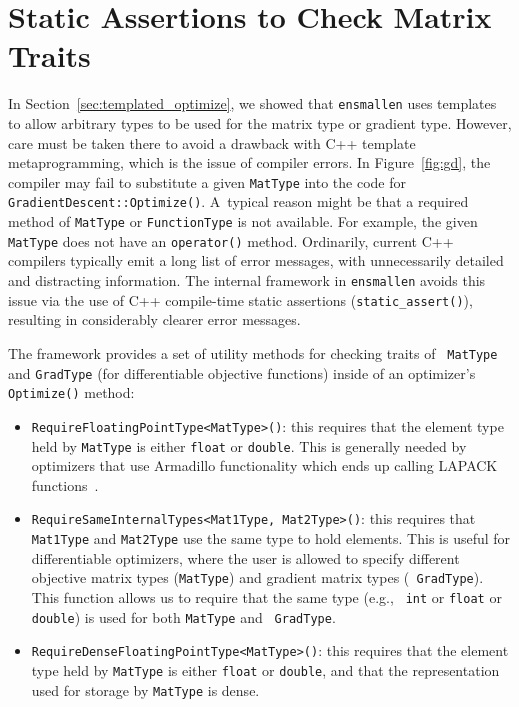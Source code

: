 \section{Static Assertions to Check Matrix Traits}
\label{sec:templated_optimize_details}

In Section~\ref{sec:templated_optimize}, we showed that {\tt ensmallen} uses
templates to allow arbitrary types to be used for the matrix type or gradient
type.
However, care must be taken there to avoid a drawback with C++ template metaprogramming,
which is the issue of compiler errors.
In Figure~\ref{fig:gd}, the compiler may fail to substitute a given {\tt MatType}
into the code for {\tt GradientDescent::Optimize()}. A~typical reason might be that
a required method of {\tt MatType} or {\tt FunctionType} is not available.
For example, the given {\tt MatType} does not have an {\tt operator\*()} method.
Ordinarily, current C++ compilers typically emit a long list of error messages,
with unnecessarily detailed and distracting information.
The internal framework in {\tt ensmallen} avoids this issue via the use of
C++ compile-time static assertions ({\tt static\_assert()}),
resulting in considerably clearer error messages.

The framework provides a set of utility methods for checking traits of {\tt
MatType} and {\tt GradType} (for differentiable objective functions) inside of
an optimizer's {\tt Optimize()} method:

\begin{itemize}
  \item {\tt RequireFloatingPointType<MatType>()}: this requires that the
element type held by {\tt MatType} is either {\tt float} or {\tt double}.
This is generally needed by optimizers that use Armadillo functionality which
ends up calling LAPACK functions~\cite{anderson1999lapack}.

  \item {\tt RequireSameInternalTypes<Mat1Type, Mat2Type>()}: this requires that
{\tt Mat1Type} and {\tt Mat2Type} use the same type to hold elements.  This is
useful for differentiable optimizers, where the user is allowed to specify
different objective matrix types ({\tt MatType}) and gradient matrix types ({\tt
GradType}).  This function allows us to require that the same type (e.g., {\tt
int} or {\tt float} or {\tt double}) is used for both {\tt MatType} and {\tt
GradType}.

  \item {\tt RequireDenseFloatingPointType<MatType>()}: this requires that the
element type held by {\tt MatType} is either {\tt float} or {\tt double}, and
that the representation used for storage by {\tt MatType} is dense.
\end{itemize}

